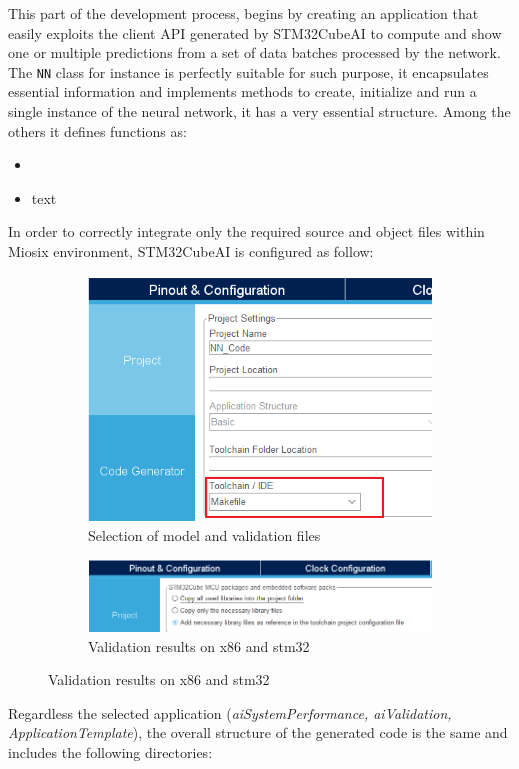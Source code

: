 This part of the development process, begins by creating an application that easily exploits the client API generated by STM32CubeAI to compute and show one or multiple predictions from a set of data batches processed by the network. The \texttt{NN} class for instance is perfectly suitable for such purpose, it encapsulates essential information and implements methods to create, initialize and run a single instance of the neural network, it has a very essential structure. Among the others it defines functions as:
\begin{itemize}
	\item 
	\item text
\end{itemize}
In order to correctly integrate only the required source and object files within Miosix environment, STM32CubeAI is configured as follow:
\begin{center}
	\begin{figure}[H]
		\begin{subfigure}[H]{0.5\textwidth}
			\hfill\includegraphics[scale=0.55]{figures/stm32cubemx_conf2.png}\vspace*{\fill}
			\hfill\caption{Selection of model and validation files}\vspace*{\fill}
		\end{subfigure}
		\hfill
		\begin{subfigure}[H]{0.5\textwidth}
			\hfill\includegraphics[scale=0.55]{figures/stm32cubemx_conf1.png}\vspace*{\fill}
			\caption{Validation results on x86 and stm32}
		\end{subfigure}
	\end{figure}
\end{center}
Regardless the selected application (\textit{aiSystemPerformance, aiValidation, ApplicationTemplate}), the overall structure of the generated code is the same and includes the following directories:

